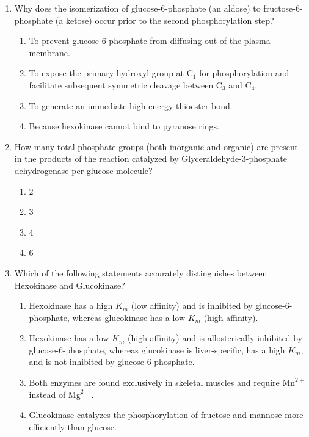 \documentclass[11pt, a4paper]{article}
\begin{document}
\begin{enumerate}[label=\textbf{\arabic*.}]
\item Why does the isomerization of glucose-6-phosphate (an aldose) to fructose-6-phosphate (a ketose) occur prior to the second phosphorylation step?
\begin{enumerate}[label=(\Alph*)]
    \item To prevent glucose-6-phosphate from diffusing out of the plasma membrane.
    \item To expose the primary hydroxyl group at $\text{C}_1$ for phosphorylation and facilitate subsequent symmetric cleavage between $\text{C}_3$ and $\text{C}_4$.
    \item To generate an immediate high-energy thioester bond.
    \item Because hexokinase cannot bind to pyranose rings.
\end{enumerate}

\item How many total phosphate groups (both inorganic and organic) are present in the products of the reaction catalyzed by Glyceraldehyde-3-phosphate dehydrogenase per glucose molecule?
\begin{enumerate}[label=(\Alph*)]
    \item 2
    \item 3
    \item 4
    \item 6
\end{enumerate}

\item Which of the following statements accurately distinguishes between Hexokinase and Glucokinase?
\begin{enumerate}[label=(\Alph*)]
    \item Hexokinase has a high $K_m$ (low affinity) and is inhibited by glucose-6-phosphate, whereas glucokinase has a low $K_m$ (high affinity).
    \item Hexokinase has a low $K_m$ (high affinity) and is allosterically inhibited by glucose-6-phosphate, whereas glucokinase is liver-specific, has a high $K_m$, and is not inhibited by glucose-6-phosphate.
    \item Both enzymes are found exclusively in skeletal muscles and require $\text{Mn}^{2+}$ instead of $\text{Mg}^{2+}$.
    \item Glucokinase catalyzes the phosphorylation of fructose and mannose more efficiently than glucose.
\end{enumerate}


\end{enumerate}
\end{document}

